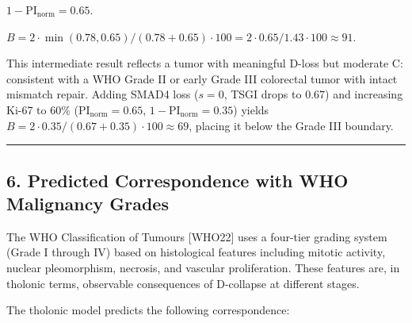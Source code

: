 \documentclass[
  11pt,
  letterpaper,
]{article}
\begin{document}
\(1 - \text{PI}_\text{norm} = 0.65\).

\(B = 2 \cdot \min(0.78, 0.65) / (0.78 + 0.65) \cdot 100 = 2 \cdot 0.65 / 1.43 \cdot 100 \approx 91\).

This intermediate result reflects a tumor with meaningful D-loss but
moderate C: consistent with a WHO Grade II or early Grade III colorectal
tumor with intact mismatch repair. Adding SMAD4 loss (\(s = 0\), TSGI
drops to 0.67) and increasing Ki-67 to 60\%
(\(\text{PI}_\text{norm} = 0.65\), \(1 - \text{PI}_\text{norm} = 0.35\))
yields \(B = 2 \cdot 0.35 / (0.67 + 0.35) \cdot 100 \approx 69\),
placing it below the Grade III boundary.

\begin{center}\rule{0.5\linewidth}{0.5pt}\end{center}

\subsection{6. Predicted Correspondence with WHO Malignancy
Grades}\label{predicted-correspondence-with-who-malignancy-grades}

The WHO Classification of Tumours {[}WHO22{]} uses a four-tier grading
system (Grade I through IV) based on histological features including
mitotic activity, nuclear pleomorphism, necrosis, and vascular
proliferation. These features are, in tholonic terms, observable
consequences of D-collapse at different stages.

The tholonic model predicts the following correspondence:
\end{document}
